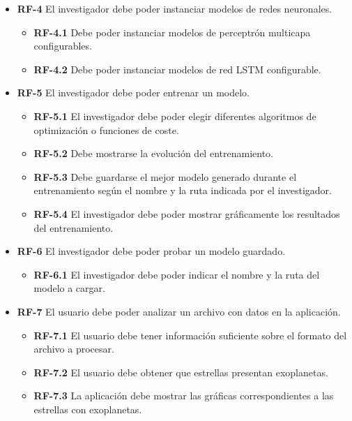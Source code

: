 \begin{itemize}
    \item \textbf{RF-4} El investigador debe poder instanciar modelos de redes neuronales.
        \begin{itemize}
            \item \textbf{RF-4.1} Debe poder instanciar modelos de perceptrón multicapa configurables.
            \item \textbf{RF-4.2} Debe poder instanciar modelos de red LSTM configurable.
        \end{itemize}
    
    \item \textbf{RF-5} El investigador debe poder entrenar un modelo.
        \begin{itemize}
            \item \textbf{RF-5.1} El investigador debe poder elegir diferentes algoritmos de optimización o funciones de coste.
            \item \textbf{RF-5.2} Debe mostrarse la evolución del entrenamiento.
            \item \textbf{RF-5.3} Debe guardarse el mejor modelo generado durante el entrenamiento según el nombre y la ruta indicada por el investigador.
            \item \textbf{RF-5.4} El investigador debe poder mostrar gráficamente los resultados del entrenamiento.
        \end{itemize}

    \item \textbf{RF-6} El investigador debe poder probar un modelo guardado.
        \begin{itemize}
            \item \textbf{RF-6.1} El investigador debe poder indicar el nombre y la ruta del modelo a cargar.
        \end{itemize}

    \item \textbf{RF-7} El usuario debe poder analizar un archivo con datos en la aplicación.
        \begin{itemize}
            \item \textbf{RF-7.1} El usuario debe tener información suficiente sobre el formato del archivo a procesar.
            \item \textbf{RF-7.2} El usuario debe obtener que estrellas presentan exoplanetas.
            \item \textbf{RF-7.3} La aplicación debe mostrar las gráficas correspondientes a las estrellas con exoplanetas.
        \end{itemize}

\end{itemize}

